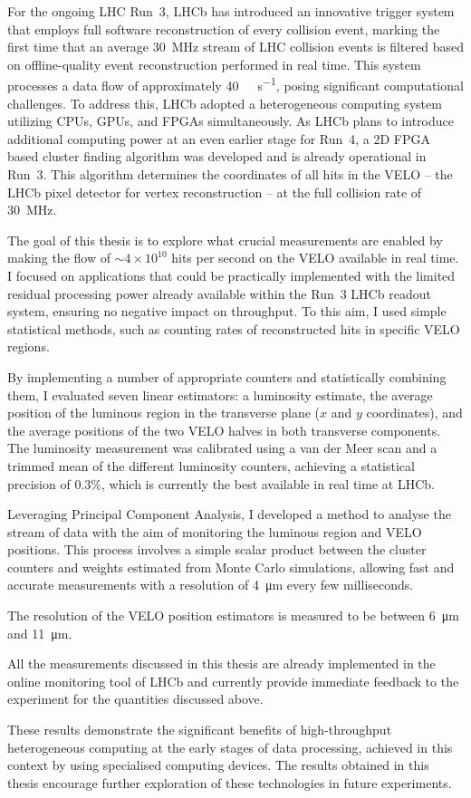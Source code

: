 For the ongoing LHC Run~3, LHCb has introduced an innovative trigger system that employs full software reconstruction of every collision event, marking the first time that an average \SI{30}{\mega\hertz} stream of LHC collision events is filtered based on offline-quality event reconstruction performed in real time. This system processes a data flow of approximately \SI{40}{\tera\bit\per\second}, posing significant computational challenges. To address this, LHCb adopted a heterogeneous computing system utilizing CPUs, GPUs, and FPGAs simultaneously. As LHCb plans to introduce additional computing power at an even earlier stage for Run~4, a 2D FPGA based cluster finding algorithm was developed and is already operational in Run~3. This algorithm determines the coordinates of all hits in the VELO -- the LHCb pixel detector for vertex reconstruction -- at the full collision rate of \SI{30}{\mega\hertz}.

The goal of this thesis is to explore what crucial measurements are enabled by making the flow  of $\sim4 \times 10^{10}$ hits per second on the VELO available in real time. I focused on applications that could be practically implemented with the limited residual processing power already available within the Run~3 LHCb readout system, ensuring no negative impact on throughput. To this aim, I used simple statistical methods, such as counting rates of reconstructed hits in specific VELO regions.

By implementing a number of appropriate counters and statistically combining them, I evaluated seven linear estimators: a luminosity estimate, the average position of the luminous region in the transverse plane ($x$ and $y$ coordinates), and the average positions of the two VELO halves in both transverse components. The luminosity measurement was calibrated using a van der Meer scan and a trimmed mean of the different luminosity counters, achieving a statistical precision of $0.3\%$, which is currently the best available in real time at LHCb.

Leveraging Principal Component Analysis, I developed a method to analyse the stream of data with the aim of monitoring the luminous region and VELO positions. This process involves a simple scalar product between the cluster counters and weights estimated from Monte Carlo simulations, allowing fast and accurate measurements with a resolution of \SI{4}{\micro\meter} every few milliseconds. 

The resolution of the VELO position estimators is measured to be between \SI{6}{\micro\meter} and \SI{11}{\micro\meter}. 

All the measurements discussed in this thesis are already implemented in the online monitoring tool of LHCb and currently provide immediate feedback to the experiment for the quantities discussed above.

These results demonstrate the significant benefits of high-throughput heterogeneous computing at the early stages of data processing, achieved in this context by using specialised computing devices. The results obtained in this thesis encourage further exploration of these technologies in future experiments.